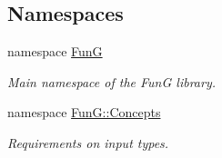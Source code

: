\subsection*{\-Namespaces}
\begin{DoxyCompactItemize}
\item 
namespace \hyperlink{namespaceFunG}{\-Fun\-G}
\begin{DoxyCompactList}\small\item\em \-Main namespace of the \-Fun\-G library. \end{DoxyCompactList}\item 
namespace \hyperlink{namespaceFunG_1_1Concepts}{\-Fun\-G\-::\-Concepts}
\begin{DoxyCompactList}\small\item\em \-Requirements on input types. \end{DoxyCompactList}\end{DoxyCompactItemize}
